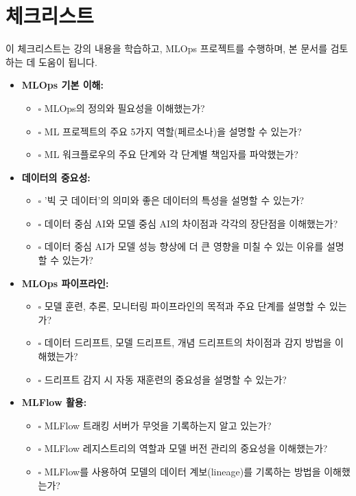 \documentclass[11pt,a4paper]{article}
\begin{document}
\newpage
\section{체크리스트}

이 체크리스트는 강의 내용을 학습하고, MLOps 프로젝트를 수행하며, 본 문서를 검토하는 데 도움이 됩니다.

\begin{itemize}
    \item \textbf{MLOps 기본 이해:}
    \begin{itemize}
        \item $\square$ MLOps의 정의와 필요성을 이해했는가?
        \item $\square$ ML 프로젝트의 주요 5가지 역할(페르소나)을 설명할 수 있는가?
        \item $\square$ ML 워크플로우의 주요 단계와 각 단계별 책임자를 파악했는가?
    \end{itemize}
    \item \textbf{데이터의 중요성:}
    \begin{itemize}
        \item $\square$ '빅 굿 데이터'의 의미와 좋은 데이터의 특성을 설명할 수 있는가?
        \item $\square$ 데이터 중심 AI와 모델 중심 AI의 차이점과 각각의 장단점을 이해했는가?
        \item $\square$ 데이터 중심 AI가 모델 성능 향상에 더 큰 영향을 미칠 수 있는 이유를 설명할 수 있는가?
    \end{itemize}
    \item \textbf{MLOps 파이프라인:}
    \begin{itemize}
        \item $\square$ 모델 훈련, 추론, 모니터링 파이프라인의 목적과 주요 단계를 설명할 수 있는가?
        \item $\square$ 데이터 드리프트, 모델 드리프트, 개념 드리프트의 차이점과 감지 방법을 이해했는가?
        \item $\square$ 드리프트 감지 시 자동 재훈련의 중요성을 설명할 수 있는가?
    \end{itemize}
    \item \textbf{MLFlow 활용:}
    \begin{itemize}
        \item $\square$ MLFlow 트래킹 서버가 무엇을 기록하는지 알고 있는가?
        \item $\square$ MLFlow 레지스트리의 역할과 모델 버전 관리의 중요성을 이해했는가?
        \item $\square$ MLFlow를 사용하여 모델의 데이터 계보(lineage)를 기록하는 방법을 이해했는가?

\end{itemize}
\end{itemize}
\end{document}
